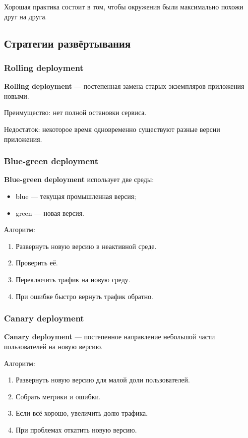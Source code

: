 \documentclass[12pt,a4paper]{article}
\begin{document}
Хорошая практика состоит в том, чтобы окружения были максимально похожи друг на друга.

\subsection{Стратегии развёртывания}

\subsubsection{Rolling deployment}

\textbf{Rolling deployment} --- постепенная замена старых экземпляров приложения новыми.

Преимущество: нет полной остановки сервиса.

Недостаток: некоторое время одновременно существуют разные версии приложения.

\subsubsection{Blue-green deployment}

\textbf{Blue-green deployment} использует две среды:

\begin{itemize}
    \item blue --- текущая промышленная версия;
    \item green --- новая версия.
\end{itemize}

Алгоритм:

\begin{enumerate}
    \item Развернуть новую версию в неактивной среде.
    \item Проверить её.
    \item Переключить трафик на новую среду.
    \item При ошибке быстро вернуть трафик обратно.
\end{enumerate}

\subsubsection{Canary deployment}

\textbf{Canary deployment} --- постепенное направление небольшой части пользователей на новую версию.

Алгоритм:

\begin{enumerate}
    \item Развернуть новую версию для малой доли пользователей.
    \item Собрать метрики и ошибки.
    \item Если всё хорошо, увеличить долю трафика.
    \item При проблемах откатить новую версию.
\end{enumerate}
\end{document}
